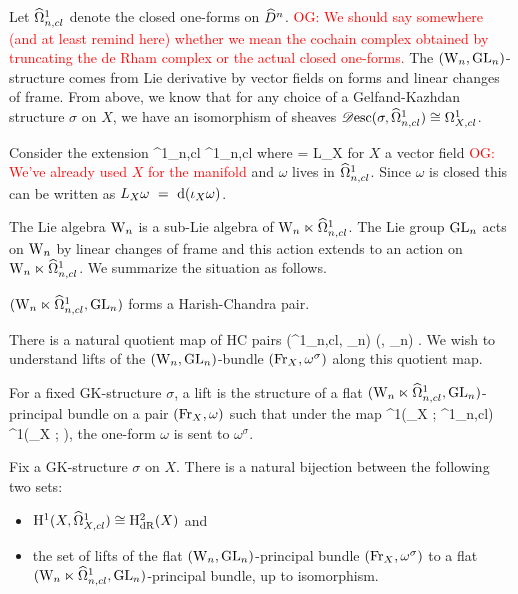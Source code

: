 \documentclass[10pt]{amsart}
\def\owen{\textcolor{red}{OG: }\textcolor{red}}
\begin{document}
Let $\widehat{\Omega}^1_{n,cl}$ denote the closed one-forms on $\widehat{D}^n$.
\owen{We should say somewhere (and at least remind here) whether we mean the cochain complex obtained by truncating the de Rham complex or the actual closed one-forms.} 
The $({{\rm W}_n}, {\rm GL}_n)$-structure comes from Lie derivative by vector fields on forms and linear
changes of frame. From above, we know that for any
choice of a Gelfand-Kazhdan structure $\sigma$ on $X$, we have an
isomorphism of sheaves $\mathscr{D}{\rm esc}(\sigma, \widehat{\Omega}^1_{n,cl}) \cong \Omega^1_{X,cl}$.

Consider the extension  
 \to \hOmega^1_{n,cl} \to \Vect \ltimes \hOmega^1_{n,cl} \to \Vect {} 
\een
where 
\ben
[X,\omega] = L_X \omega 
\een
for $X$ a vector field \owen{We've already used $X$ for the manifold} and $\omega$ lives in $\widehat{\Omega}^1_{n,cl}$.
Since $\omega$ is closed this
can be written as $L_X \omega~=~{\rm d}(\iota_X \omega)$.

The Lie algebra ${{\rm W}_n}$ is a sub-Lie algebra of ${{\rm W}_n} \ltimes
\widehat{\Omega}^1_{n,cl}$. The Lie group ${\rm GL}_n$ acts on ${{\rm W}_n}$ by linear
changes of frame and this action extends to an action on ${{\rm W}_n} \ltimes
\widehat{\Omega}^{1}_{n,cl}$. We summarize the situation as follows.

\begin{lemma} 
$({{\rm W}_n} \ltimes \widehat{\Omega}^1_{n,cl}, {\rm GL}_n)$ forms a Harish-Chandra pair. 
\end{lemma}
 
There is a natural quotient map of HC pairs
\ben
(\Vect \ltimes \hOmega^1_{n,cl}, \GL_n) \to (\Vect, \GL_n) .
\een 
We wish to understand lifts of the $({{\rm W}_n}, {\rm GL}_n)$-bundle $({\rm Fr}_X,
\omega^\sigma)$ along this quotient map.

For a fixed GK-structure $\sigma$, a lift is the structure of a flat $({{\rm W}_n} \ltimes
\widehat{\Omega}^1_{n,cl}, {\rm GL}_n)$-principal bundle on a pair $({\rm Fr}_X, \omega)$
such that under the map
\ben
\Omega^1(\Fr_X ; \Vect \ltimes \hOmega^1_{n,cl}) \to \Omega^1(\Fr_X ;
\Vect),
\een
the one-form $\omega$ is sent to $\omega^\sigma$. 

\begin{prop} 
Fix a GK-structure $\sigma$ on $X$. 
There is a natural bijection between the following two sets:
\begin{itemize}
\item ${\rm H}^1(X, \widehat{\Omega}^1_{X,cl}) \cong {\rm H}^2_{{\rm dR}}(X)$ and
\item the set of lifts of the flat $({{\rm W}_n}, {\rm GL}_n)$-principal bundle $({\rm Fr}_X, \omega^\sigma)$ to a flat $({{\rm W}_n} \ltimes \widehat{\Omega}^1_{n,cl}, {\rm GL}_n)$-principal bundle, up to isomorphism.
\end{itemize}
\end{prop}
\end{document}
